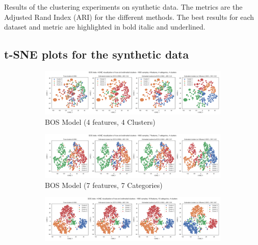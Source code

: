 \begin{table}[H]
\caption{Results of the clustering experiments on synthetic data. The metrics are the Adjusted Rand Index (ARI) for the different methods. The best results for each dataset and metric are highlighted in bold italic and underlined.}
    \label{tab:results_synth_clustering}
\end{table}

\subsection*{t-SNE plots for the synthetic data}
\label{sec:appendix_tsne_synth}

\begin{figure}[H]
    \centering
    \begin{subfigure}[b]{0.49\textwidth}
        \includegraphics[width=\textwidth]{python_figures/tsne_bos_n1000_d4_m4_k4.png}
        \caption{BOS Model (4 features, 4 Clusters)}
        \label{fig:tsne_bos_4d}
    \end{subfigure}
    \hfill
    \begin{subfigure}[b]{0.49\textwidth}
        \includegraphics[width=\textwidth]{python_figures/tsne_bos_n1000_d7_m7_k4.png}
        \caption{BOS Model (7 features, 7 Categories)}
        \label{fig:tsne_bos_7d}
    \end{subfigure}
    \newline
    \begin{subfigure}[b]{0.49\textwidth}
        \includegraphics[width=\textwidth]{python_figures/tsne_bos_n1000_d10_m10_k4.png}

\end{subfigure}
\end{figure}
